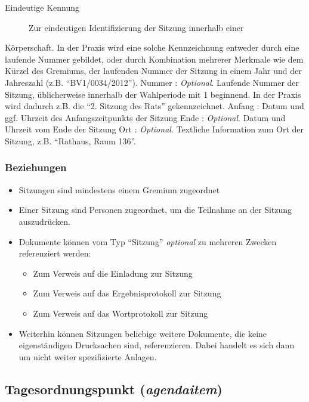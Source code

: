 \documentclass[,a4paper]{article}
\begin{document}
\begin{description}
\item[Eindeutige Kennung]
Zur eindeutigen Identifizierung der Sitzung innerhalb einer
\end{description}

Körperschaft. In der Praxis wird eine solche Kennzeichnung entweder
durch eine laufende Nummer gebildet, oder durch Kombination mehrerer
Merkmale wie dem Kürzel des Gremiums, der laufenden Nummer der Sitzung
in einem Jahr und der Jahreszahl (z.B. ``BV1/0034/2012''). Nummer :
\emph{Optional}. Laufende Nummer der Sitzung, üblicherweise innerhalb
der Wahlperiode mit 1 beginnend. In der Praxis wird dadurch z.B. die
``2. Sitzung des Rats'' gekennzeichnet. Anfang : Datum und ggf. Uhrzeit
des Anfangszeitpunkts der Sitzung Ende : \emph{Optional}. Datum und
Uhrzeit vom Ende der Sitzung Ort : \emph{Optional}. Textliche
Information zum Ort der Sitzung, z.B. ``Rathaus, Raum 136''.

\subsubsection{Beziehungen}

\begin{itemize}
\item
  Sitzungen sind mindestens einem Gremium zugeordnet
\item
  Einer Sitzung sind Personen zugeordnet, um die Teilnahme an der
  Sitzung auszudrücken.
\item
  Dokumente können vom Typ ``Sitzung'' \emph{optional} zu mehreren
  Zwecken referenziert werden:

  \begin{itemize}
  \item
    Zum Verweis auf die Einladung zur Sitzung
  \item
    Zum Verweis auf das Ergebnisprotokoll zur Sitzung
  \item
    Zum Verweis auf das Wortprotokoll zur Sitzung
  \end{itemize}
\item
  Weiterhin können Sitzungen beliebige weitere Dokumente, die keine
  eigenständigen Drucksachen sind, referenzieren. Dabei handelt es sich
  dann um nicht weiter spezifizierte Anlagen.
\end{itemize}

\subsection{Tagesordnungspunkt (\emph{agendaitem})}
\end{document}
